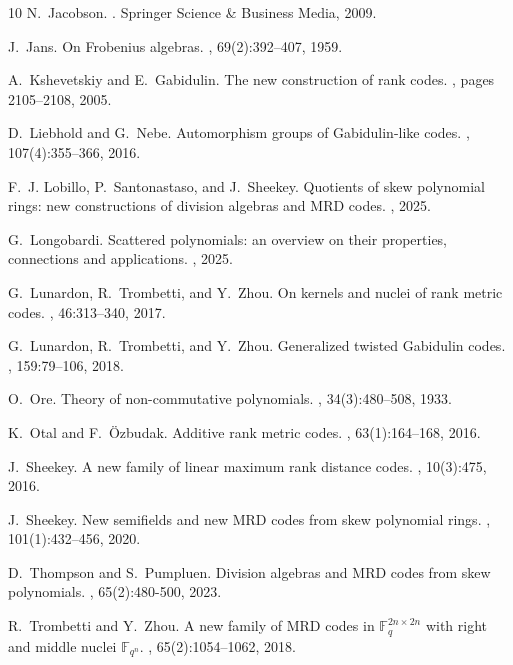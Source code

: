 \documentclass[a4paper, 11pt]{article}
\begin{document}
\begin{thebibliography}{10}
N.~Jacobson.
.
\newblock Springer Science \& Business Media, 2009.

J.~Jans.
\newblock On Frobenius algebras.
, 69(2):392--407, 1959.

A.~Kshevetskiy and E.~Gabidulin.
\newblock The new construction of rank codes.
, pages 2105--2108, 2005.

D.~Liebhold and G.~Nebe.
\newblock Automorphism groups of {G}abidulin-like codes.
, 107(4):355--366, 2016.

F.~J. Lobillo, P.~Santonastaso, and J.~Sheekey.
\newblock Quotients of skew polynomial rings: new constructions of division
  algebras and {MRD} codes.
, 2025.

G.~Longobardi.
\newblock Scattered polynomials: an overview on their properties, connections
  and applications.
, 2025.

G.~Lunardon, R.~Trombetti, and Y.~Zhou.
\newblock On kernels and nuclei of rank metric codes.
, 46:313--340, 2017.

G.~Lunardon, R.~Trombetti, and Y.~Zhou.
\newblock Generalized twisted {G}abidulin codes.
, 159:79--106, 2018.

O.~Ore.
\newblock Theory of non-commutative polynomials.
, 34(3):480--508, 1933.

K.~Otal and F.~{\"O}zbudak.
\newblock Additive rank metric codes.
, 63(1):164--168, 2016.

J.~Sheekey.
\newblock A new family of linear maximum rank distance codes.
, 10(3):475, 2016.

J.~Sheekey.
\newblock New semifields and new {MRD} codes from skew polynomial rings.
, 101(1):432--456,
  2020.

D.~Thompson and S.~Pumpluen.
\newblock Division algebras and {MRD} codes from skew polynomials.
, 65(2):480-500, 2023.

R.~Trombetti and Y.~Zhou.
\newblock A new family of {MRD} codes in {$\mathbb F_{q}^{2n\times 2n}$} with
  right and middle nuclei {$\mathbb F_{q^n}$}.
, 65(2):1054--1062,
  2018.

\end{thebibliography}
\end{document}
